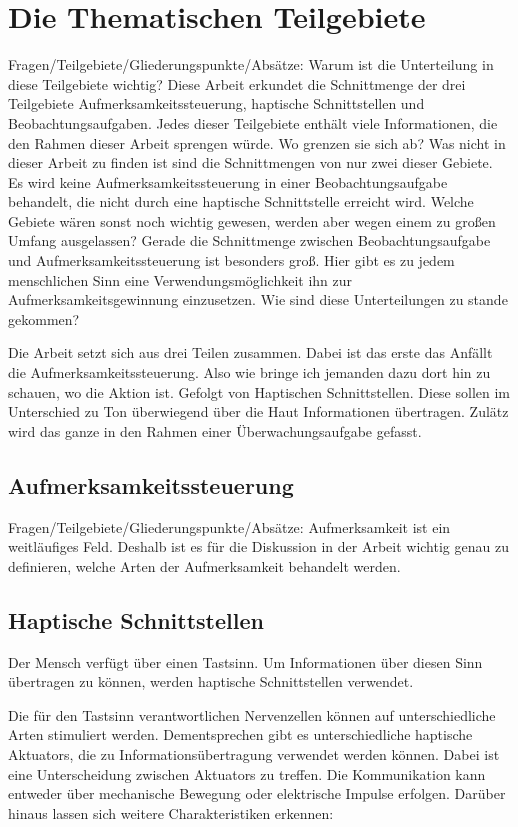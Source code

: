 \documentclass{llncs}					%
\begin{document}
\section{Die Thematischen Teilgebiete}
Fragen/Teilgebiete/Gliederungspunkte/Absätze:
Warum ist die Unterteilung in diese Teilgebiete wichtig?
Diese Arbeit erkundet die Schnittmenge der drei Teilgebiete Aufmerksamkeitssteuerung, haptische Schnittstellen und Beobachtungsaufgaben. Jedes dieser Teilgebiete enthält viele Informationen, die den Rahmen dieser Arbeit sprengen würde.
Wo grenzen sie sich ab?
Was nicht in dieser Arbeit zu finden ist sind die Schnittmengen von nur zwei dieser Gebiete. Es wird keine Aufmerksamkeitssteuerung in einer Beobachtungsaufgabe behandelt, die nicht durch eine haptische Schnittstelle erreicht wird.
Welche Gebiete wären sonst noch wichtig gewesen, werden aber wegen einem zu großen Umfang ausgelassen?
Gerade die Schnittmenge zwischen Beobachtungsaufgabe und Aufmerksamkeitssteuerung ist besonders groß. Hier gibt es zu jedem menschlichen Sinn eine Verwendungsmöglichkeit ihn zur Aufmerksamkeitsgewinnung einzusetzen.
Wie sind diese Unterteilungen zu stande gekommen?

Die Arbeit setzt sich aus drei Teilen zusammen. Dabei ist das erste das Anfällt die Aufmerksamkeitssteuerung. Also wie bringe ich jemanden dazu dort hin zu schauen, wo die Aktion ist. Gefolgt von Haptischen Schnittstellen. Diese sollen im Unterschied zu Ton überwiegend über die Haut Informationen übertragen. Zulätz wird das ganze in den Rahmen einer Überwachungsaufgabe gefasst.

\subsection{Aufmerksamkeitssteuerung}
Fragen/Teilgebiete/Gliederungspunkte/Absätze:
Aufmerksamkeit ist ein weitläufiges Feld. Deshalb ist es für die Diskussion in der Arbeit wichtig genau zu definieren, welche Arten der Aufmerksamkeit behandelt werden.

\newpage
\subsection{Haptische Schnittstellen}
Der Mensch verfügt über einen Tastsinn. Um Informationen über diesen Sinn übertragen zu können, werden haptische Schnittstellen verwendet. 

 
Die für den Tastsinn verantwortlichen Nervenzellen können auf unterschiedliche Arten stimuliert werden. Dementsprechen gibt es unterschiedliche haptische \glspl{Aktuator}, die zu Informationsübertragung verwendet werden können. Dabei ist eine Unterscheidung zwischen \glspl{Aktuator} zu treffen. Die Kommunikation kann entweder über mechanische Bewegung oder elektrische Impulse erfolgen. Darüber hinaus lassen sich weitere Charakteristiken erkennen:
\end{document}
